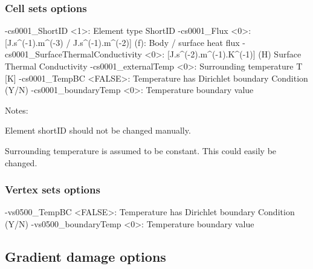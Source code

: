 \documentclass[10pt,oneside]{memoir}
\begin{document}
\subsubsection{Cell sets options}
\small{\begin{boxedverbatim}
-cs0001_ShortID <1>: Element type ShortID 
-cs0001_Flux <0>: [J.s^(-1).m^(-3) / J.s^(-1).m^(-2)] (f): Body / surface heat flux 
-cs0001_SurfaceThermalConductivity <0>: [J.s^(-2).m^(-1).K^(-1)]
                                        (H) Surface Thermal Conductivity 
-cs0001_externalTemp <0>: Surrounding temperature T [K] 
-cs0001_TempBC <FALSE>:   Temperature has Dirichlet boundary Condition (Y/N) 
-cs0001_boundaryTemp <0>: Temperature boundary value 
\end{boxedverbatim}}
Notes:
\begin{compactenum}
\item Element shortID should not be changed manually. 
\item Surrounding temperature is assumed to be constant. This could easily be changed.
\end{compactenum}

\subsubsection{Vertex sets options}
\small{\begin{boxedverbatim}
-vs0500_TempBC <FALSE>:   Temperature has Dirichlet boundary Condition (Y/N) 
-vs0500_boundaryTemp <0>: Temperature boundary value 
\end{boxedverbatim}}

\subsection{Gradient damage options}
\end{document}
